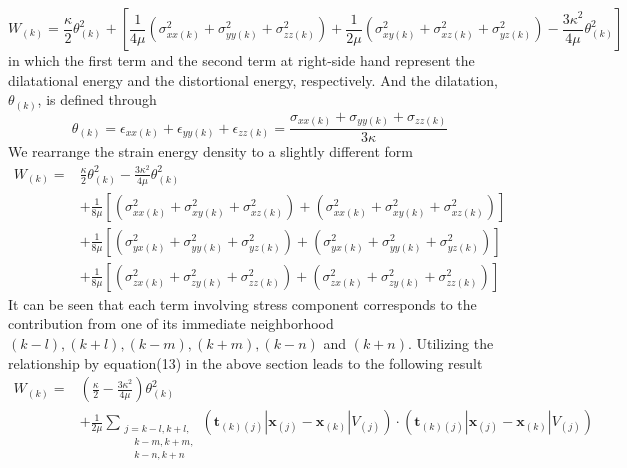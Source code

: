 \documentclass[a4paper,11pt,CJK]{paper}
\newcommand{\bfxj}{\textbf{x}_{(j)}}
\newcommand{\bfxk}{\textbf{x}_{(k)}}
\newcommand{\tkj}{\textbf{t}_{(k)(j)}}
\newcommand{\thetak}{\theta_{(k)}}
\begin{document}
\begin{equation}
W_{(k)} = \frac{\kappa}{2}\thetak^2+\left[\frac{1}{4\mu}(\sigma_{xx(k)}^2+\sigma_{yy(k)}^2+\sigma_{zz(k)}^2)
                                         +\frac{1}{2\mu}(\sigma_{xy(k)}^2+\sigma_{xz(k)}^2+\sigma_{yz(k)}^2)
                                         -\frac{3\kappa^2}{4\mu}\thetak^2
                                    \right]
\end{equation}
in which the first term and the second term at right-side hand represent the dilatational energy and the  distortional energy, respectively.
And the dilatation, $\thetak$, is defined through
\begin{equation}
\thetak = \epsilon_{xx(k)}+\epsilon_{yy(k)}+\epsilon_{zz(k)} = \frac{\sigma_{xx(k)}+\sigma_{yy(k)}+\sigma_{zz(k)}}{3\kappa}
\end{equation}
We rearrange the strain energy density to a slightly different form
\begin{equation}
\begin{aligned}
W_{(k)} =& \frac{\kappa}{2}\thetak^2 -\frac{3\kappa^2}{4\mu}\thetak^2 \\
         &+\frac{1}{8\mu}\left[(\sigma_{xx(k)}^2+\sigma_{xy(k)}^2+\sigma_{xz(k)}^2) + (\sigma_{xx(k)}^2+\sigma_{xy(k)}^2+\sigma_{xz(k)}^2)\right]\\
         &+\frac{1}{8\mu}\left[(\sigma_{yx(k)}^2+\sigma_{yy(k)}^2+\sigma_{yz(k)}^2) + (\sigma_{yx(k)}^2+\sigma_{yy(k)}^2+\sigma_{yz(k)}^2)\right]\\
         &+\frac{1}{8\mu}\left[(\sigma_{zx(k)}^2+\sigma_{zy(k)}^2+\sigma_{zz(k)}^2) + (\sigma_{zx(k)}^2+\sigma_{zy(k)}^2+\sigma_{zz(k)}^2)\right]
\end{aligned}
\end{equation}
It can be seen that each term involving stress component corresponds to the contribution from one of its immediate neighborhood $(k-l),(k+l),(k-m),(k+m),(k-n)$ and $(k+n)$.
Utilizing the relationship by equation(13) in the above section leads to the following result
\begin{equation}
\begin{aligned}
W_{(k)} =& (\frac{\kappa}{2} -\frac{3\kappa^2}{4\mu})\thetak^2 \\
         &+\frac{1}{2\mu}\sum_{\substack {j=k-l,k+l,\\ \quad k-m,k+m,\\ \quad k-n,k+n}}(\tkj|\bfxj-\bfxk|V_{(j)})\cdot(\tkj|\bfxj-\bfxk|V_{(j)})
\end{aligned}
\end{equation}
\end{document}
